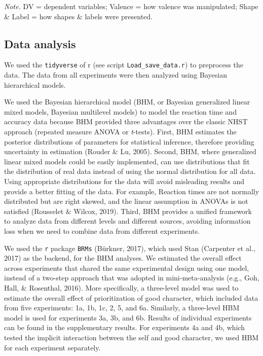 \documentclass[
  man]{apa6}
\begin{document}
\begin{table}[tbp]
\begin{center}
\begin{threeparttable}
\begin{tablenotes}[para]
\normalsize{\textit{Note.} DV = dependent variables; Valence = how valence was manipulated; Shape \& Label = how shapes \& labels were presented.}
\end{tablenotes}

\end{threeparttable}
\end{center}

\end{table}

\hypertarget{data-analysis}{%
\subsection{Data analysis}\label{data-analysis}}

We used the \texttt{tidyverse} of r (see script \texttt{Load\_save\_data.r}) to preprocess the data. The data from all experiments were then analyzed using Bayesian hierarchical models.

We used the Bayesian hierarchical model (BHM, or Bayesian generalized linear mixed models, Bayesian multilevel models) to model the reaction time and accuracy data because BHM provided three advantages over the classic NHST approach (repeated measure ANOVA or \emph{t}-tests). First, BHM estimates the posterior distributions of parameters for statistical inference, therefore providing uncertainty in estimation (Rouder \& Lu, 2005). Second, BHM, where generalized linear mixed models could be easily implemented, can use distributions that fit the distribution of real data instead of using the normal distribution for all data. Using appropriate distributions for the data will avoid misleading results and provide a better fitting of the data. For example, Reaction times are not normally distributed but are right skewed, and the linear assumption in ANOVAs is not satisfied (Rousselet \& Wilcox, 2019). Third, BHM provides a unified framework to analyze data from different levels and different sources, avoiding information loss when we need to combine data from different experiments.

We used the \texttt{r} package \texttt{BRMs} (Bürkner, 2017), which used Stan (Carpenter et al., 2017) as the backend, for the BHM analyses. We estimated the overall effect across experiments that shared the same experimental design using one model, instead of a two-step approach that was adopted in mini-meta-analysis (e.g., Goh, Hall, \& Rosenthal, 2016). More specifically, a three-level model was used to estimate the overall effect of prioritization of good character, which included data from five experiments: 1a, 1b, 1c, 2, 5, and 6a. Similarly, a three-level HBM model is used for experiments 3a, 3b, and 6b. Results of individual experiments can be found in the supplementary results. For experiments 4a and 4b, which tested the implicit interaction between the self and good character, we used HBM for each experiment separately.
\end{document}
